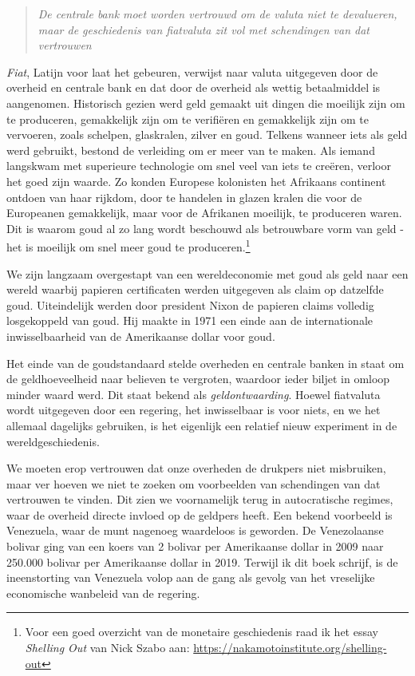 \documentclass[
  letterpaper,
]{scrbook}
\begin{document}
\begin{quote}
\emph{De centrale bank moet worden vertrouwd om de valuta niet te
devalueren, maar de geschiedenis van fiatvaluta zit vol met schendingen
van dat vertrouwen}
\end{quote}

\emph{Fiat}, Latijn voor laat het gebeuren, verwijst naar valuta
uitgegeven door de overheid en centrale bank en dat door de overheid als
wettig betaalmiddel is aangenomen. Historisch gezien werd geld gemaakt
uit dingen die moeilijk zijn om te produceren, gemakkelijk zijn om te
verifiëren en gemakkelijk zijn om te vervoeren, zoals schelpen,
glaskralen, zilver en goud. Telkens wanneer iets als geld werd gebruikt,
bestond de verleiding om er meer van te maken. Als iemand langskwam met
superieure technologie om snel veel van iets te creëren, verloor het
goed zijn waarde. Zo konden Europese kolonisten het Afrikaans continent
ontdoen van haar rijkdom, door te handelen in glazen kralen die voor de
Europeanen gemakkelijk, maar voor de Afrikanen moeilijk, te produceren
waren. Dit is waarom goud al zo lang wordt beschouwd als betrouwbare
vorm van geld - het is moeilijk om snel meer goud te
produceren.\footnote{Voor een goed overzicht van de monetaire
  geschiedenis raad ik het essay \emph{Shelling Out} van Nick Szabo aan:
  \url{https://nakamotoinstitute.org/shelling-out}}

We zijn langzaam overgestapt van een wereldeconomie met goud als geld
naar een wereld waarbij papieren certificaten werden uitgegeven als
claim op datzelfde goud. Uiteindelijk werden door president Nixon de
papieren claims volledig losgekoppeld van goud. Hij maakte in 1971 een
einde aan de internationale inwisselbaarheid van de Amerikaanse dollar
voor goud.

Het einde van de goudstandaard stelde overheden en centrale banken in
staat om de geldhoeveelheid naar believen te vergroten, waardoor ieder
biljet in omloop minder waard werd. Dit staat bekend als
\emph{geldontwaarding}. Hoewel fiatvaluta wordt uitgegeven door een
regering, het inwisselbaar is voor niets, en we het allemaal dagelijks
gebruiken, is het eigenlijk een relatief nieuw experiment in de
wereldgeschiedenis.

We moeten erop vertrouwen dat onze overheden de drukpers niet
misbruiken, maar ver hoeven we niet te zoeken om voorbeelden van
schendingen van dat vertrouwen te vinden. Dit zien we voornamelijk terug
in autocratische regimes, waar de overheid directe invloed op de
geldpers heeft. Een bekend voorbeeld is Venezuela, waar de munt nagenoeg
waardeloos is geworden. De Venezolaanse bolivar ging van een koers van 2
bolivar per Amerikaanse dollar in 2009 naar 250.000 bolivar per
Amerikaanse dollar in 2019. Terwijl ik dit boek schrijf, is de
ineenstorting van Venezuela volop aan de gang als gevolg van het
vreselijke economische wanbeleid van de regering.
\end{document}
